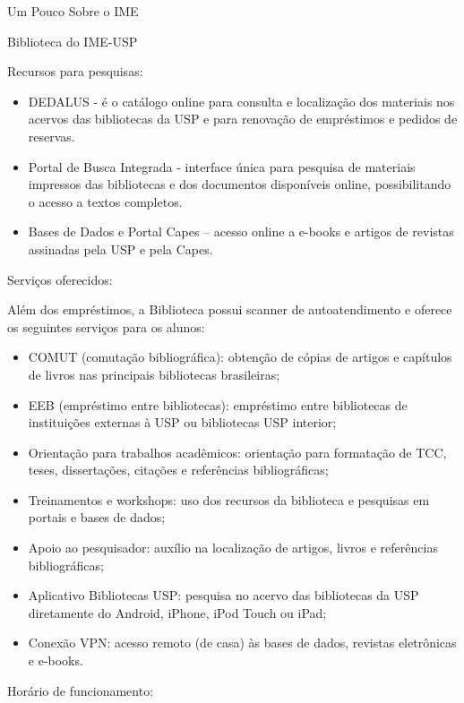 \begin{secao}{Um Pouco Sobre o IME}
\begin{subsecao}{Biblioteca do IME-USP}
\begin{subsubsecao}{Recursos para pesquisas:}
\begin{itemize}
    \item DEDALUS - é o catálogo online para consulta e localização dos materiais nos acervos das bibliotecas da USP e para renovação de empréstimos e pedidos de reservas. 
    \item Portal de Busca Integrada - interface única para pesquisa de materiais impressos das bibliotecas e dos documentos disponíveis online, possibilitando o acesso a textos completos. 
    \item Bases de Dados e Portal Capes – acesso online a e-books e artigos de revistas assinadas pela USP e pela Capes.
    \end{itemize}
\end{subsubsecao}

\begin{subsubsecao}{Serviços oferecidos:}

Além dos empréstimos, a Biblioteca possui scanner de autoatendimento e oferece os seguintes serviços para os alunos:
\begin{itemize}
    \item COMUT (comutação bibliográfica): obtenção de cópias de artigos e capítulos de livros nas principais bibliotecas brasileiras; 
    \item EEB (empréstimo entre bibliotecas): empréstimo entre bibliotecas de instituições externas à USP ou bibliotecas USP interior;
    \item Orientação para trabalhos acadêmicos: orientação para formatação de TCC, teses, dissertações, citações e referências bibliográficas;
    \item Treinamentos e workshops: uso dos recursos da biblioteca e pesquisas em portais e bases de dados;
    \item Apoio ao pesquisador: auxílio na localização de artigos, livros e referências bibliográficas;
    \item Aplicativo Bibliotecas USP: pesquisa no acervo das bibliotecas da USP diretamente do Android, iPhone, iPod Touch ou iPad; 
    \item Conexão VPN: acesso remoto (de casa) às bases de dados, revistas eletrônicas e e-books. 
\end{itemize}
\end{subsubsecao}

\begin{subsubsecao}{Horário de funcionamento:}


\end{subsubsecao}
\end{subsecao}
\end{secao}
